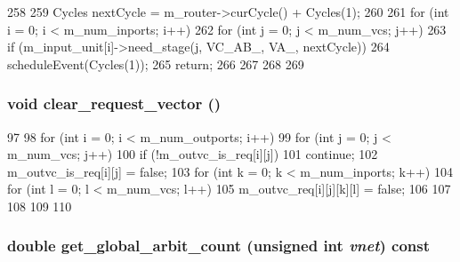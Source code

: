 \begin{DoxyCode}
258 {
259     Cycles nextCycle = m_router->curCycle() + Cycles(1);
260 
261     for (int i = 0; i < m_num_inports; i++) {
262         for (int j = 0; j < m_num_vcs; j++) {
263             if (m_input_unit[i]->need_stage(j, VC_AB_, VA_, nextCycle)) {
264                 scheduleEvent(Cycles(1));
265                 return;
266             }
267         }
268     }
269 }
\end{DoxyCode}
\hypertarget{classVCallocator__d_ac8b7aea8034854f208223b1c36fe1b68}{
\subsubsection[{clear\_\-request\_\-vector}]{\setlength{\rightskip}{0pt plus 5cm}void clear\_\-request\_\-vector ()}}
\label{classVCallocator__d_ac8b7aea8034854f208223b1c36fe1b68}



\begin{DoxyCode}
97 {
98     for (int i = 0; i < m_num_outports; i++) {
99         for (int j = 0; j < m_num_vcs; j++) {
100             if (!m_outvc_is_req[i][j])
101                 continue;
102             m_outvc_is_req[i][j] = false;
103             for (int k = 0; k < m_num_inports; k++) {
104                 for (int l = 0; l < m_num_vcs; l++) {
105                     m_outvc_req[i][j][k][l] = false;
106                 }
107             }
108         }
109     }
110 }
\end{DoxyCode}
\hypertarget{classVCallocator__d_a26898553ccbde5e4d6e3c339788bdf5a}{
\subsubsection[{get\_\-global\_\-arbit\_\-count}]{\setlength{\rightskip}{0pt plus 5cm}double get\_\-global\_\-arbit\_\-count (unsigned int {\em vnet}) const}}
\label{classVCallocator__d_a26898553ccbde5e4d6e3c339788bdf5a}




